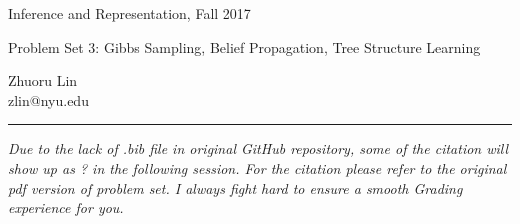 \documentclass{article}
\newcommand{\ruleskip}{\bigskip\hrule\bigskip}
\begin{document}
\pagestyle{myheadings} 

{\LARGE
\begin{center}Inference and Representation, Fall 2017\end{center}
}

{\Large
Problem Set 3: Gibbs Sampling,  Belief Propagation, Tree Structure Learning
}
\begin{center}
Zhuoru Lin\\
zlin@nyu.edu
\end{center}


\ruleskip 
{\em Due to the lack of .bib file in original GitHub repository, some of the citation will show up as ? in the following session. For the citation please refer to the original pdf version of problem set. I always fight hard to ensure a smooth Grading experience for you. }

\end{document}
